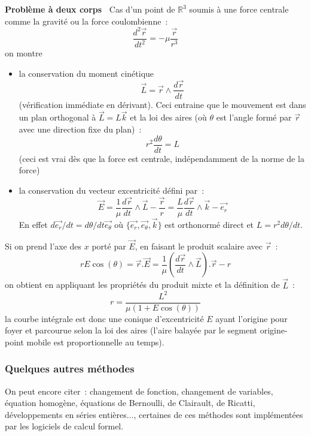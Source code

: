 \documentclass[a4paper,11pt]{article}
\newcommand{\R}{{\mathbb{R}}}
\begin{document}
{\bf Probl\`eme \`a deux corps~} 
Cas d'un point de $\R^3$
soumis \`a une force centrale
comme la gravit\'e ou la force coulombienne~:
$$\frac{d^2 \overrightarrow{r}}{dt^2}=-\mu \frac{\overrightarrow{r}}{r^3}$$ 
on montre
\begin{itemize}
\item  la conservation du moment cin\'etique 
$$\overrightarrow{L}=
\overrightarrow{r} \wedge \frac{d \overrightarrow{r}}{dt}$$
(v\'erification imm\'ediate en d\'erivant).
Ceci entraine que
le mouvement est dans un plan orthogonal \`a 
$\overrightarrow{L}=L\overrightarrow{k}$
et la loi des aires (o\`u $\theta$ est l'angle form\'e par 
$\overrightarrow{r}$ avec une direction fixe du plan)~:
$$r^2 \frac{d\theta}{dt}=L$$
(ceci est vrai d\`es que la force est centrale, ind\'ependamment
de la norme de la force)
\item la conservation du vecteur excentricit\'e d\'efini par~:
\[ \overrightarrow{E}= \frac{1}{\mu} \frac{d\overrightarrow{r}}{dt} \wedge 
\overrightarrow{L} - \frac{\overrightarrow{r}}{r} 
= \frac{L }{\mu} \frac{d\overrightarrow{r}}{dt} \wedge 
\overrightarrow{k} - \overrightarrow{e_r} \]
En effet $d \overrightarrow{e_r}/dt=d\theta/dt
\overrightarrow{e_\theta}$ o\`u $\{ \overrightarrow{e_r},
\overrightarrow{e_\theta}, \overrightarrow{k} \}$ est orthonorm\'e direct
et $L=r^2 d\theta/dt$.
\end{itemize}
Si on prend l'axe des $x$ port\'e par $\overrightarrow{E}$,
en faisant le produit scalaire avec $\overrightarrow{r}$~:
$$rE \cos(\theta)=\overrightarrow{r}.\overrightarrow{E}
= \frac{1}{\mu} 
(\frac{d\overrightarrow{r}}{dt} \wedge \overrightarrow{L}) . \overrightarrow{r} - r$$
on obtient en appliquant les propri\'et\'es du produit mixte et la
d\'efinition de $\overrightarrow{L}$~:
\[ r = \frac{L^2}{\mu(1+E \cos(\theta))}\]
la courbe int\'egrale est donc une conique d'excentricit\'e $E$
ayant l'origine pour foyer et parcourue selon la loi des aires
(l'aire balay\'ee par le segment origine-point mobile est
proportionnelle au temps).

\subsubsection{Quelques autres m\'ethodes}
On peut encore citer~: 
changement de fonction, changement de variables, 
\'equation homog\`ene, \'equations de Bernoulli,
de Clairault, de Ricatti, d\'eveloppements en s\'eries
enti\`eres..., certaines de ces m\'ethodes sont
impl\'ement\'ees par les logiciels de calcul formel.
\end{document}
